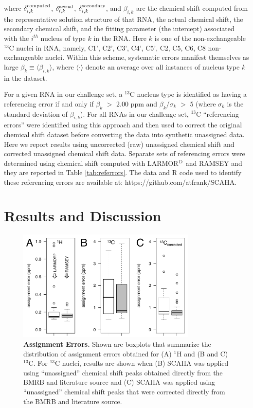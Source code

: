 \documentclass[journal=jcisd8,manuscript=article,layout=onecolumn]{achemso}
\begin{document}
where $\delta^{\rm computed}_{i, k}$, $\delta^{\rm actual}_{i, k}$, $\delta^{\rm secondary}_{i, k}$, and $\beta_{i, k}$ are the chemical shift computed from the representative solution structure of that RNA, the actual chemical shift,  the secondary chemical shift, and  the fitting parameter (the intercept) associated with the $i^{th}$ nucleus of type $k$ in the RNA. Here $k$ is one of the non-exchangeable $^{13}$C nuclei in RNA, namely, C1', C2', C3', C4', C5', C2, C5, C6, C8 non-exchangeable nuclei. Within this scheme, systematic errors manifest themselves as large $\beta_{k} \equiv \langle\beta_{i, k} \rangle$, where $\langle\cdot \rangle$ denote an average over all instances of nucleus type $k$ in the dataset. 


For a given RNA in our challenge set, a $^{13}$C nucleus type is identified as having a referencing error if and only if $\beta_{k}$  $>$ 2.00 ppm  and $\beta_{k}$/$\sigma_{k}$ $>$ 5 (where $\sigma_{k}$ is the standard deviation of  $\beta_{i, k}$). For all RNAs in our challenge set, $^{13}$C ``referencing errors'' were identified using this approach and then used to correct the original chemical shift dataset before converting the data into synthetic unassigned data. Here we report results using uncorrected (raw) unassigned chemical shift and corrected unassigned chemical shift data. Separate sets of referencing errors were determined using chemical shift computed with LARMOR$^{\rm D}$ and RAMSEY and they are reported in Table \ref{tab:referrors}. The data and R code  used to identify these referencing errors are available at: https://github.com/atfrank/SCAHA.

\section{Results and Discussion}
\begin{figure}[h!]
  \centering
       \includegraphics[width=0.8\textwidth]{figure_1}
  \caption{\textbf{Assignment Errors.} Shown are boxplots that summarize the distribution of assignment errors obtained for (A) $^{1}$H and (B and C) $^{13}$C. For $^{13}$C nuclei, results are shown when (B) SCAHA was applied using ``unassigned'' chemical shift peaks obtained directly from the BMRB and literature source and (C) SCAHA was applied using ``unassigned'' chemical shift peaks that were corrected  directly from the BMRB and literature source.}
  \label{fig:bar}
\end{figure}
\end{document}
